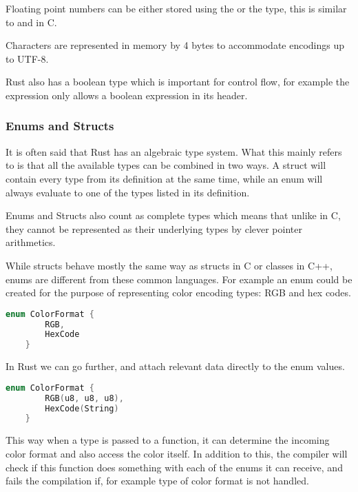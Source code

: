 Floating point numbers can be either stored using the  or the  type, this is similar to  and  in C.

Characters are represented in memory by 4 bytes to accommodate encodings up to UTF-8.

Rust also has a boolean type which is important for control flow, for example the  expression only allows a boolean expression in its header.

\subsubsection{Enums and Structs}

It is often said that Rust has an algebraic type system. What this mainly refers to is that all the available types can be combined in two ways. A struct will contain every type from its definition at the same time, while an enum will always evaluate to one of the types listed in its definition.

Enums and Structs also count as complete types which means that unlike in C, they cannot be represented as their underlying types by clever pointer arithmetics.

While structs behave mostly the same way as structs in C or classes in C++, enums are different from these common languages. For example an enum could be created for the purpose of representing color encoding types: RGB and hex codes.

\begin{lstlisting}[language=C,frame=single,float=!ht,label={lst:rust-enum},caption={Rust Enum Example}]
    enum ColorFormat {
        RGB,
        HexCode
    }
\end{lstlisting}

In Rust we can go further, and attach relevant data directly to the enum values.

\begin{lstlisting}[language=C,frame=single,float=!ht,label={lst:rust-enum-advanced},caption={Rust Enum Example With Data}]
    enum ColorFormat {
        RGB(u8, u8, u8),
        HexCode(String)
    }
\end{lstlisting}

This way when a  type is passed to a function, it can determine the incoming color format and also access the color itself. In addition to this, the compiler will check if this function does something with each of the enums it can receive, and fails the compilation if, for example  type of color format is not handled.

